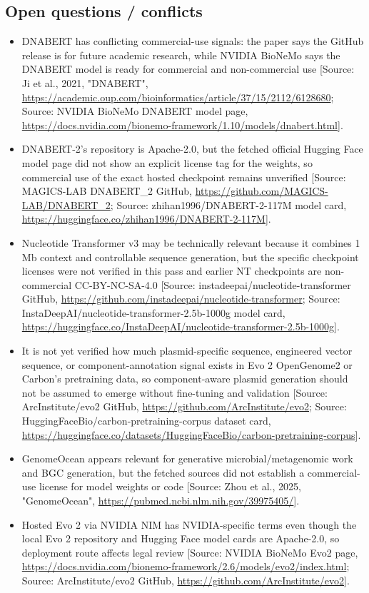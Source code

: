 \documentclass[11pt]{report}
\begin{document}
\subsection{Open questions / conflicts}
\begin{itemize}
\item DNABERT has conflicting commercial-use signals: the paper says the GitHub release is for future academic research, while NVIDIA BioNeMo says the DNABERT model is ready for commercial and non-commercial use [Source: Ji et al., 2021, "DNABERT", \url{https://academic.oup.com/bioinformatics/article/37/15/2112/6128680}; Source: NVIDIA BioNeMo DNABERT model page, \url{https://docs.nvidia.com/bionemo-framework/1.10/models/dnabert.html}].
\item DNABERT-2's repository is Apache-2.0, but the fetched official Hugging Face model page did not show an explicit license tag for the weights, so commercial use of the exact hosted checkpoint remains unverified [Source: MAGICS-LAB DNABERT\_2 GitHub, \url{https://github.com/MAGICS-LAB/DNABERT_2}; Source: zhihan1996/DNABERT-2-117M model card, \url{https://huggingface.co/zhihan1996/DNABERT-2-117M}].
\item Nucleotide Transformer v3 may be technically relevant because it combines 1 Mb context and controllable sequence generation, but the specific checkpoint licenses were not verified in this pass and earlier NT checkpoints are non-commercial CC-BY-NC-SA-4.0 [Source: instadeepai/nucleotide-transformer GitHub, \url{https://github.com/instadeepai/nucleotide-transformer}; Source: InstaDeepAI/nucleotide-transformer-2.5b-1000g model card, \url{https://huggingface.co/InstaDeepAI/nucleotide-transformer-2.5b-1000g}].
\item It is not yet verified how much plasmid-specific sequence, engineered vector sequence, or component-annotation signal exists in Evo 2 OpenGenome2 or Carbon's pretraining data, so component-aware plasmid generation should not be assumed to emerge without fine-tuning and validation [Source: ArcInstitute/evo2 GitHub, \url{https://github.com/ArcInstitute/evo2}; Source: HuggingFaceBio/carbon-pretraining-corpus dataset card, \url{https://huggingface.co/datasets/HuggingFaceBio/carbon-pretraining-corpus}].
\item GenomeOcean appears relevant for generative microbial/metagenomic work and BGC generation, but the fetched sources did not establish a commercial-use license for model weights or code [Source: Zhou et al., 2025, "GenomeOcean", \url{https://pubmed.ncbi.nlm.nih.gov/39975405/}].
\item Hosted Evo 2 via NVIDIA NIM has NVIDIA-specific terms even though the local Evo 2 repository and Hugging Face model cards are Apache-2.0, so deployment route affects legal review [Source: NVIDIA BioNeMo Evo2 page, \url{https://docs.nvidia.com/bionemo-framework/2.6/models/evo2/index.html}; Source: ArcInstitute/evo2 GitHub, \url{https://github.com/ArcInstitute/evo2}].
\end{itemize}
\end{document}
